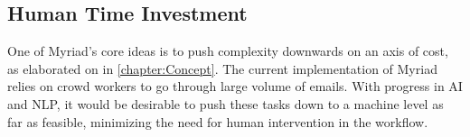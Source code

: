 \subsection{Human Time Investment}

One of Myriad’s core ideas is to push complexity downwards on an axis of cost, as elaborated on in \autoref{chapter:Concept}. The current implementation of Myriad relies on crowd workers to go through large volume of emails. With progress in AI and NLP, it would be desirable to push these tasks down to a machine level as far as feasible, minimizing the need for human intervention in the workflow.


